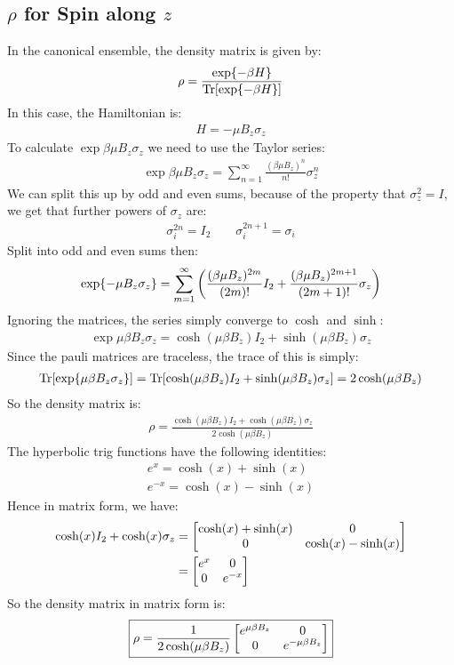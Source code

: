 \documentclass[12pt]{article}
\begin{document}
\subsection{$\rho$ for Spin along $z$}
In the canonical ensemble, the density matrix is given by:
\begin{align*}
  \rho=\frac{\exp{-\beta H}}{\Tr[\exp{-\beta H}]}
\end{align*}
In this case, the Hamiltonian is:
\begin{align*}
  H=-\mu B_z\sigma_z
\end{align*}
To calculate $\exp{\beta\mu B_z\sigma_z}$ we need to use the Taylor series:
\begin{align*}
  \exp{\beta\mu B_z\sigma_z}=\sum_{n=1}^\infty
  \frac{(\beta\mu B_z)^n}{n!}\sigma_z^n
\end{align*}
We can split this up by odd and even sums, because of the property that $\sigma_z^2=I$, we get that further powers of $\sigma_z$ are:
\begin{align*}
  \sigma_i^{2n}=I_2\qquad \sigma_i^{2n+1}=\sigma_i
\end{align*}
Split into odd and even sums then:
\begin{align*}
  \exp{-\mu B_z\sigma_z}=\sum_{m=1}^\infty
  \qty(\frac{(\beta\mu B_z)^{2m}}{(2m)!}I_2
  +\frac{(\beta\mu B_z)^{2m+1}}{(2m+1)!}\sigma_z)
\end{align*}
Ignoring the matrices, the series simply converge to $\cosh$ and $\sinh$:
\begin{align*}
  \exp{\mu\beta B_z\sigma_z}=\cosh(\mu\beta B_z)I_2+\sinh(\mu\beta B_z)\sigma_z
\end{align*}
Since the pauli matrices are traceless, the trace of this is simply:
\begin{align*}
  \Tr[\exp{\mu\beta B_z\sigma_z}]=
  \Tr[\cosh(\mu\beta B_z)I_2+\sinh(\mu\beta B_z)\sigma_z]=2\cosh(\mu\beta B_z)
\end{align*}
So the density matrix is:
\begin{align*}
  \rho=\frac{\cosh(\mu\beta B_z)I_2+\cosh(\mu\beta B_z)\sigma_z}
  {2\cosh(\mu\beta B_z)}
\end{align*}
The hyperbolic trig functions have the following identities:
\begin{align*}
  e^x=\cosh(x)+\sinh(x)\\
  e^{-x}=\cosh(x)-\sinh(x)
\end{align*}
Hence in matrix form, we have:
\begin{align*}
  \cosh(x)I_2+\cosh(x)\sigma_z&=
  \bmqty{\cosh(x)+\sinh(x)&0\\0&\cosh(x)-\sinh(x)}\\
  &=\bmqty{e^x&0\\0&e^{-x}}
\end{align*}
So the density matrix in matrix form is:
\begin{align}
  \boxed{\rho=\frac1{2\cosh(\mu\beta B_z)}
  \bmqty{e^{\mu\beta B_z}&0\\0&e^{-\mu\beta B_z}}}
\end{align}
\end{document}
